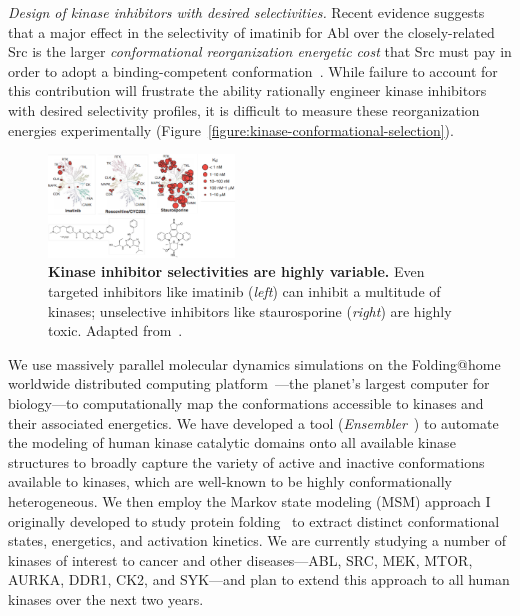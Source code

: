 \documentclass[10pt]{article}
\begin{document}
\emph{Design of kinase inhibitors with desired selectivities.}
Recent evidence suggests that a major effect in the selectivity of imatinib for Abl over the closely-related Src is the larger \emph{conformational reorganization energetic cost} that Src must pay in order to adopt a binding-competent conformation~\cite{seeliger:2007:structure:imatinib-binding,simonson:j-biol-chem:2010:imatinib-selectivity,roux:pnas:2013:gleevec-selectivity}.
While failure to account for this contribution will frustrate the ability rationally engineer kinase inhibitors with desired selectivity profiles, it is difficult to measure these reorganization energies experimentally (Figure~\ref{figure:kinase-conformational-selection}).

\begin{figure}
\vspace{-0.3cm}
\includegraphics[width=0.44\textwidth]{figures/kinase-inhibitor-selectivity.pdf}
\vspace{-0.3cm}
\caption{\footnotesize \label{figure:kinase-inhibitor-selectivity} {\bf Kinase inhibitor selectivities are highly variable.}
Even targeted inhibitors like imatinib (\emph{left}) can inhibit a multitude of kinases; unselective inhibitors like staurosporine (\emph{right}) are highly toxic.
Adapted from~\cite{fabian:nature-biotech:2005:kinase-selectivity-map}.}
\end{figure}

We use massively parallel molecular dynamics simulations on the Folding@home worldwide distributed computing platform~\cite{shirts-pande:science:2000:folding-at-home}---the planet's largest computer for biology---to computationally map the conformations accessible to kinases and their associated energetics.
We have developed a tool (\emph{Ensembler}~\cite{ensembler}) to automate the modeling of human kinase catalytic domains onto all available kinase structures to broadly capture the variety of active and inactive conformations available to kinases, which are well-known to be highly conformationally heterogeneous. 
We then employ the Markov state modeling (MSM) approach I originally developed to study protein folding~\cite{chodera:2006:mms:long-time-dynamics,chodera:jcp:2007,noe:jcp:2011:msm-review} to extract distinct conformational states, energetics, and activation kinetics.
We are currently studying a number of kinases of interest to cancer and other diseases---ABL, SRC, MEK, MTOR, AURKA, DDR1, CK2, and SYK---and plan to extend this approach to all human kinases over the next two years.
\end{document}
